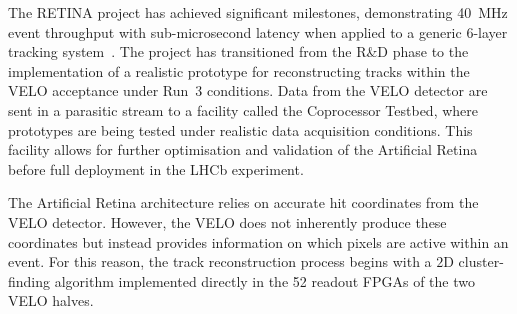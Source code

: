 The RETINA project has achieved significant milestones, demonstrating \SI{40}{\mega\hertz} event throughput with sub-microsecond latency when applied to a generic 6-layer tracking system~\cite{Abba_2015}. The project has transitioned from the R\&D phase to the implementation of a realistic prototype for reconstructing tracks within the VELO acceptance under Run~3 conditions. Data from the VELO detector are sent in a parasitic stream to a facility called the Coprocessor Testbed, where  prototypes are being tested under realistic data acquisition conditions. This facility allows for further optimisation and validation of the Artificial Retina before full deployment in the LHCb experiment.

The Artificial Retina architecture relies on accurate hit coordinates from the VELO detector. However, the VELO does not inherently produce these coordinates but instead provides information on which pixels are active within an event. For this reason, the track reconstruction process begins with a $2$D cluster-finding algorithm implemented directly in the 52 readout FPGAs of the two VELO halves.






